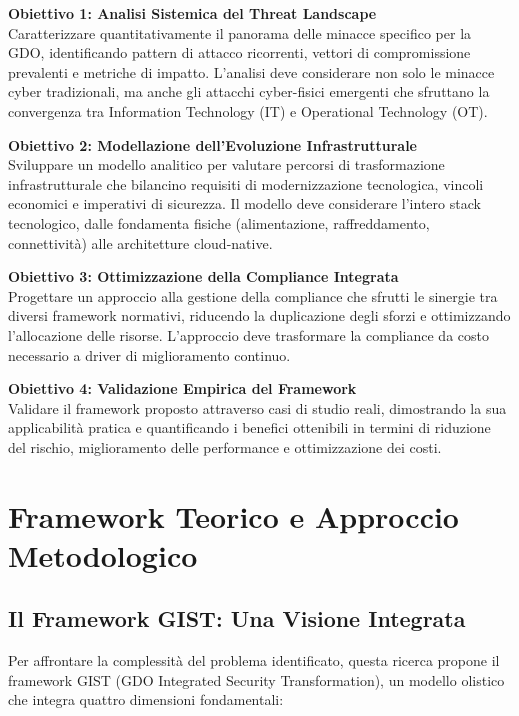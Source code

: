 \textbf{Obiettivo 1: Analisi Sistemica del Threat Landscape}\\
Caratterizzare quantitativamente il panorama delle minacce specifico per la GDO, identificando pattern di attacco ricorrenti, vettori di compromissione prevalenti e metriche di impatto. L'analisi deve considerare non solo le minacce cyber tradizionali, ma anche gli attacchi cyber-fisici emergenti che sfruttano la convergenza tra Information Technology (IT) e Operational Technology (OT).

\textbf{Obiettivo 2: Modellazione dell'Evoluzione Infrastrutturale}\\
Sviluppare un modello analitico per valutare percorsi di trasformazione infrastrutturale che bilancino requisiti di modernizzazione tecnologica, vincoli economici e imperativi di sicurezza. Il modello deve considerare l'intero stack tecnologico, dalle fondamenta fisiche (alimentazione, raffreddamento, connettività) alle architetture cloud-native.

\textbf{Obiettivo 3: Ottimizzazione della Compliance Integrata}\\
Progettare un approccio alla gestione della compliance che sfrutti le sinergie tra diversi framework normativi, riducendo la duplicazione degli sforzi e ottimizzando l'allocazione delle risorse. L'approccio deve trasformare la compliance da costo necessario a driver di miglioramento continuo.

\textbf{Obiettivo 4: Validazione Empirica del Framework}\\
Validare il framework proposto attraverso casi di studio reali, dimostrando la sua applicabilità pratica e quantificando i benefici ottenibili in termini di riduzione del rischio, miglioramento delle performance e ottimizzazione dei costi.

\section{Framework Teorico e Approccio Metodologico}

\subsection{Il Framework GIST: Una Visione Integrata}

Per affrontare la complessità del problema identificato, questa ricerca propone il framework GIST (GDO Integrated Security Transformation), un modello olistico che integra quattro dimensioni fondamentali:

